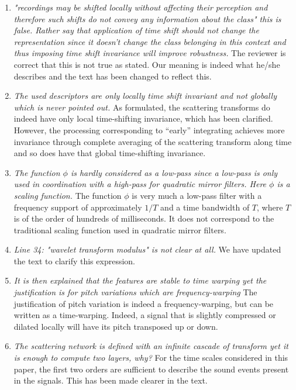 \documentclass[10pt]{article}
\begin{document}
\begin{enumerate}
\item \emph{"recordings may be shifted locally 
without affecting their perception and therefore such shifts do not convey any information about the class" this is false. Rather say that application of time shift should not change the representation since it doesn't change the class belonging in this context and thus imposing time shift invariance will improve robustness.}
The reviewer is correct that this is not true as stated. Our meaning is indeed what he/she describes and the text has been changed to reflect this.

\item \emph{The used descriptors are only locally time shift invariant and not globally which is never pointed out.}
As formulated, the scattering transforms do indeed have only local time-shifting invariance, which has been clarified. However, the processing corresponding to ``early'' integrating achieves more invariance through complete averaging of the scattering transform along time and so does have that global time-shifting invariance.

\item \emph{The function $\phi$ is hardly considered as a low-pass since a low-pass is only used in coordination with a high-pass for quadratic mirror filters. Here $\phi$ is a scaling function.}
The function $\phi$ is very much a low-pass filter with a frequency support of approximately $1/T$ and a time bandwidth of $T$, where $T$ is of the order of hundreds of milliseconds. It does not correspond to the traditional scaling function used in quadratic mirror filters.

\item \emph{Line 34: "wavelet transform modulus" is not clear at all.}
We have updated the text to clarify this expression.

\item \emph{It is then explained that the features are stable to time warping yet the justification is for pitch variations which are frequency-warping}
The justification of pitch variation is indeed a frequency-warping, but can be written as a time-warping. Indeed, a signal that is slightly compressed or dilated locally will have its pitch transposed up or down.

\item \emph{The scattering network is defined with an infinite cascade of transform yet it is enough to compute two layers, why?}
For the time scales considered in this paper, the first two orders are sufficient to describe the sound events present in the signals. This has been made clearer in the text.


\end{enumerate}
\end{document}
